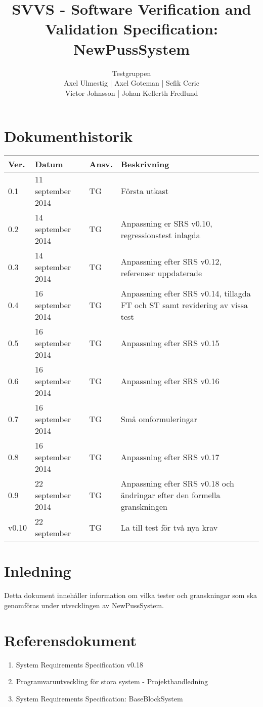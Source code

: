 \documentclass[a4paper]{article}
\title{SVVS - Software Verification and Validation Specification: NewPussSystem}
\author{Testgruppen \\ Axel Ulmestig | Axel Goteman | Sefik Ceric \\ Victor Johnsson | Johan Kellerth Fredlund}
\date{}
\begin{document}
\maketitle
\thispagestyle{fancy}
\tableofcontents
\newpage

\section*{Dokumenthistorik}

\begin{tabular}{ l l l p{9cm} }
Ver. & Datum & Ansv. & Beskrivning \\\hline
0.1 & 11 september 2014 & TG & Första utkast \\
0.2 & 14 september 2014 & TG & Anpassning er SRS v0.10, regressionstest inlagda \\
0.3 & 14 september 2014 & TG & Anpassning efter SRS v0.12, referenser uppdaterade\\
0.4 & 16 september 2014 & TG & Anpassning efter SRS v0.14, tillagda FT och ST samt revidering av vissa test\\
0.5 & 16 september 2014 & TG & Anpassning efter SRS v0.15\\
0.6 & 16 september 2014 & TG & Anpassning efter SRS v0.16\\
0.7 & 16 september 2014 & TG & Små omformuleringar \\
0.8 & 16 september 2014 & TG & Anpassning efter SRS v0.17\\
0.9 & 22 september 2014 & TG & Anpassning efter SRS v0.18 och ändringar efter den formella granskningen \\
v0.10 & 22 september & TG & La till test för två nya krav

\end{tabular}
\section{Inledning}       

Detta dokument innehåller information om vilka tester och granskningar som ska genomföras under utvecklingen av NewPussSystem.

\section{Referensdokument}
\begin{enumerate}
\item System Requirements Specification v0.18
\item Programvaruutveckling för stora system - Projekthandledning
\item System Requirements Specification: BaseBlockSystem
\end{enumerate}
\end{document}

